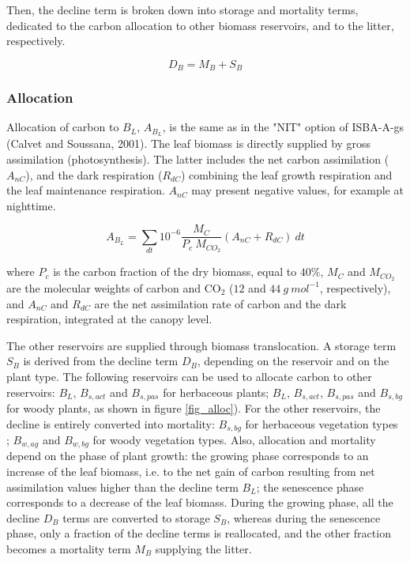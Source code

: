 {Then, the decline term is broken down into storage and mortality terms, dedicated to the carbon allocation 
to other biomass reservoirs, and to the litter, respectively.

\begin{equation}
D_B = M_B + S_B
\label{eqpartdecl}
\end{equation}





\subsubsection{Allocation}
\label{subs:isbacc_alim}

Allocation of carbon to $B_L$, $A_{B_L}$, is the same as in the "NIT" option 
of ISBA-A-gs (Calvet and Soussana, 2001). 
The leaf biomass is directly supplied by gross assimilation (photosynthesis). 
The latter includes the net carbon assimilation 
($A_{nC}$), and the dark respiration ($R_{dC}$) 
combining the leaf growth respiration and the leaf maintenance respiration. 
$A_{nC}$ may present negative values, for example at nighttime.

\begin{equation}
A_{B_L} = \sum_{dt} 10^{-6} \frac{M_C}{P_c\:M_{CO_2}} (A_{nC} + R_{dC}) \: dt
\label{eqbass}
\end{equation}

where $P_c$ is the carbon fraction of the dry biomass, 
equal to $40\%$, $M_C$ and $M_{CO_2}$ are the molecular weights of carbon and 
CO$_2$ ($12$ and $44\: g \:mol^{-1}$, respectively), and $A_{nC}$ and $R_{dC}$
are the net assimilation rate of carbon and the dark respiration, 
integrated at the canopy level.


The other reservoirs are supplied through biomass translocation. 
A storage term $S_B$ is derived from the decline term $D_B$, depending on the 
reservoir and on the plant type. The following reservoirs can be used to allocate 
carbon to other reservoirs: $B_L$, $B_{s,act}$ and $B_{s,pas}$ for herbaceous plants; 
$B_L$, $B_{s,act}$, $B_{s,pas}$ and $B_{s,bg}$ for woody plants, as shown in 
figure \ref{fig_alloc}).
For the other reservoirs, the decline is entirely converted into mortality: 
$B_{s,bg}$ for herbaceous vegetation types ; $B_{w,ag}$ and 
$B_{w,bg}$ for woody vegetation types.
Also, allocation and mortality depend on the phase of plant growth: 
the growing phase corresponds to an increase of the leaf biomass, i.e. to the net 
gain of carbon resulting from net assimilation values higher than the decline term 
$B_L$; the senescence phase corresponds to 
a decrease of the leaf biomass.
During the growing phase, all the decline $D_B$ terms are converted to 
storage $S_B$, whereas during the senescence phase, only a fraction of the decline terms is reallocated, 
and the other fraction becomes a mortality term $M_B$ supplying the litter.

}
